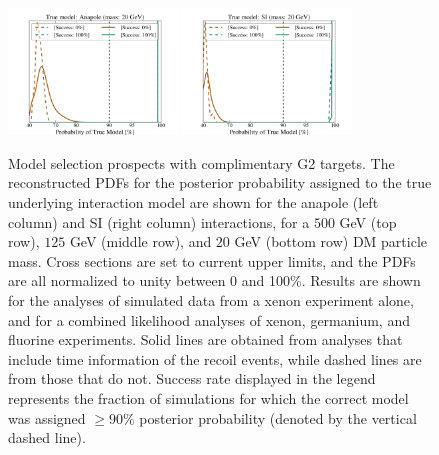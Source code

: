 \documentclass[11pt, a4paper]{article}
\begin{document}
\begin{figure}
\includegraphics[width=0.4\textwidth, trim=.6cm 0.0cm .6cm 0.0cm,clip=true]{plots/PDF_Single_20GeV_Anapole_50sims_Xe_vs_FGeXe_GF_TNT.pdf}
\includegraphics[width=0.4\textwidth, trim=.6cm 0.0cm .6cm 0.0cm,clip=true]{plots/PDF_Single_20GeV_SI_Higgs_50sims_Xe_vs_FGeXe_GF_TNT.pdf}
\caption{\label{fig:gen2}
Model selection prospects with complimentary G2 targets. The reconstructed PDFs for the posterior probability assigned to the true underlying interaction model are shown for the anapole (left column) and SI (right column) interactions, for a $500$ GeV (top row), $125$ GeV (middle row), and $20$ GeV (bottom row) DM particle mass. Cross sections are set to current upper limits, and the PDFs are all normalized to unity between 0 and 100$\%$. Results are shown for the analyses of simulated data from a xenon experiment alone, and for a combined likelihood analyses of xenon, germanium, and fluorine experiments. Solid lines are obtained from analyses that include time information of the recoil events, while dashed lines are from those that do not. Success rate displayed in the legend represents the fraction of simulations for which the correct model was assigned $ \geq 90\%$ posterior probability (denoted by the vertical dashed line).}
\end{figure}
\end{document}
